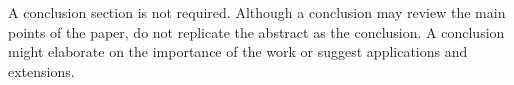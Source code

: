 \documentclass[letterpaper, 10 pt, conference]{ieeeconf}  %
\theoremstyle{tight}
\begin{document}
A conclusion section is not required. Although a conclusion may review the main points of the paper, do not replicate the abstract as the conclusion. A conclusion might elaborate on the importance of the work or suggest applications and extensions. 

\addtolength{\textheight}{-12cm}   %
\end{document}
